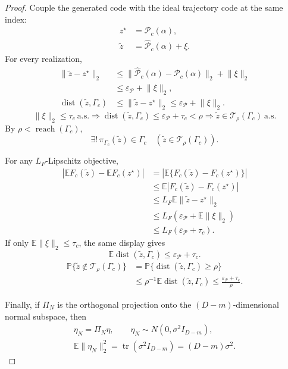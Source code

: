 \documentclass{article}
\begin{document}
\begin{proof}
	Couple the generated code with the ideal trajectory code at the same index:
	\[
	\begin{aligned}
	z^\star&=\mathcal{P}_c(\alpha),\\
	\tilde z&=\widehat{\mathcal{P}}_c(\alpha)+\xi .
	\end{aligned}
	\]
	For every realization,
	\[
	\begin{aligned}
	\lVert \tilde z-z^\star\rVert_2
	&\le
	\lVert\widehat{\mathcal{P}}_c(\alpha)-\mathcal{P}_c(\alpha)\rVert_2+\lVert\xi\rVert_2\\
	&\le \varepsilon_{\mathcal{P}}+\lVert\xi\rVert_2,\\
	\operatorname{dist}(\tilde z,\Gamma_c)
	&\le \lVert \tilde z-z^\star\rVert_2
	\le \varepsilon_{\mathcal{P}}+\lVert\xi\rVert_2 .
	\end{aligned}
	\]
	\[
	\lVert\xi\rVert_2\le\tau_c\ \mathrm{a.s.}
	\Longrightarrow
	\operatorname{dist}(\tilde z,\Gamma_c)
	\le \varepsilon_{\mathcal{P}}+\tau_c
	<\rho
	\Longrightarrow
	\tilde z\in\mathcal{T}_\rho(\Gamma_c)\ \mathrm{a.s.}
	\]
	By $\rho<\operatorname{reach}(\Gamma_c)$,
	\[
	\exists!\,\pi_{\Gamma_c}(\tilde z)\in\Gamma_c
	\quad
	(\tilde z\in\mathcal{T}_\rho(\Gamma_c)).
	\]

	For any $L_F$-Lipschitz objective,
	\[
	\begin{aligned}
	\left|\mathbb{E}F_c(\tilde z)-\mathbb{E}F_c(z^\star)\right|
	&=
	\left|\mathbb{E}\{F_c(\tilde z)-F_c(z^\star)\}\right|\\
	&\le
	\mathbb{E}\left|F_c(\tilde z)-F_c(z^\star)\right|\\
	&\le
	L_F\mathbb{E}\lVert\tilde z-z^\star\rVert_2\\
	&\le
	L_F\left(\varepsilon_{\mathcal{P}}+\mathbb{E}\lVert\xi\rVert_2\right)\\
	&\le
	L_F(\varepsilon_{\mathcal{P}}+\tau_c).
	\end{aligned}
	\]
	If only $\mathbb{E}\lVert\xi\rVert_2\le\tau_c$, the same display gives
	\[
	\mathbb{E}\operatorname{dist}(\tilde z,\Gamma_c)
	\le
	\varepsilon_{\mathcal{P}}+\tau_c .
	\]
	\[
	\begin{aligned}
	\mathbb{P}\{\tilde z\notin\mathcal{T}_\rho(\Gamma_c)\}
	&=
	\mathbb{P}\{\operatorname{dist}(\tilde z,\Gamma_c)\ge\rho\}\\
	&\le
	\rho^{-1}\mathbb{E}\operatorname{dist}(\tilde z,\Gamma_c)
	\le
	\frac{\varepsilon_{\mathcal{P}}+\tau_c}{\rho}.
	\end{aligned}
	\]

	Finally, if $\Pi_N$ is the orthogonal projection onto the $(D-m)$-dimensional normal subspace, then
	\[
	\begin{gathered}
	\eta_N=\Pi_N\eta,\qquad
	\eta_N\sim N(0,\sigma^2 I_{D-m}),\\
	\mathbb{E}\lVert\eta_N\rVert_2^2
	=
	\operatorname{tr}(\sigma^2 I_{D-m})
	=
	(D-m)\sigma^2 .
	\end{gathered}
	\]
\end{proof}
\end{document}
